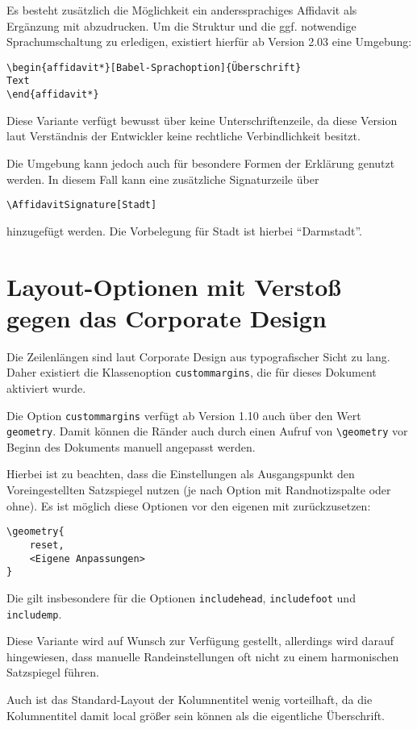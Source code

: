 \documentclass[
	ngerman,
	ruledheaders=section,%
	class=report,%
	thesis={type=bachelor},%
	accentcolor=9c,%
	custommargins=true,%
	marginpar=false,%
	parskip=half-,%
	fontsize=11pt,%
]{tudapub}
\let\code\texttt
\let\tbs\textbackslash
\begin{document}
Es besteht zusätzlich die Möglichkeit ein anderssprachiges Affidavit als Ergänzung mit abzudrucken. Um die Struktur und die ggf. notwendige Sprachumschaltung zu erledigen, existiert hierfür ab Version 2.03 eine Umgebung:

\begin{verbatim}
\begin{affidavit*}[Babel-Sprachoption]{Überschrift}
Text
\end{affidavit*}
\end{verbatim}

Diese Variante verfügt bewusst über keine Unterschriftenzeile, da diese Version laut Verständnis der Entwickler keine rechtliche Verbindlichkeit besitzt.

Die Umgebung kann jedoch auch für besondere Formen der Erklärung genutzt werden. In diesem Fall kann eine zusätzliche Signaturzeile über
\begin{verbatim}
\AffidavitSignature[Stadt]
\end{verbatim}
hinzugefügt werden. Die Vorbelegung für Stadt ist hierbei \enquote{Darmstadt}.

\section{Layout-Optionen mit Verstoß gegen das Corporate Design}
Die Zeilenlängen sind laut Corporate Design aus typografischer Sicht zu lang.
Daher existiert die Klassenoption \code{custommargins}, die für dieses Dokument aktiviert wurde.

Die Option \code{custommargins} verfügt ab Version 1.10 auch über den Wert \code{geometry}. Damit können die Ränder auch durch einen Aufruf von \code{\tbs{}geometry} vor Beginn des Dokuments manuell angepasst werden.

Hierbei ist zu beachten, dass die Einstellungen als Ausgangspunkt den Voreingestellten Satzspiegel nutzen (je nach Option mit Randnotizspalte oder ohne). Es ist möglich diese Optionen vor den eigenen mit zurückzusetzen:
\begin{verbatim}
\geometry{
	reset,
	<Eigene Anpassungen>
}
\end{verbatim}
Die gilt insbesondere für die Optionen \code{includehead}, \code{includefoot} und \code{includemp}.

Diese Variante wird auf Wunsch zur Verfügung gestellt, allerdings wird darauf hingewiesen, dass manuelle Randeinstellungen oft nicht zu einem harmonischen Satzspiegel führen.

Auch ist das Standard-Layout der Kolumnentitel wenig vorteilhaft, da die Kolumnentitel damit local größer sein können als die eigentliche Überschrift.
\end{document}

